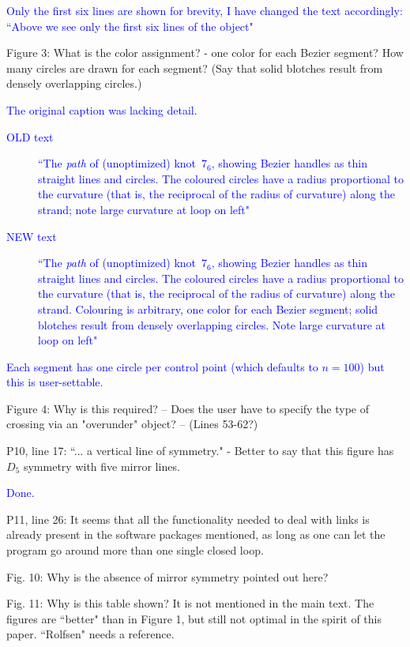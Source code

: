 \documentclass[12pt]{article}
\begin{document}
\textcolor{blue}{Only the first six lines are shown for brevity, I have
  changed the text accordingly: ``Above we see only the first six lines
of the object"}


Figure 3: What is the color assignment? - one color for each Bezier
segment?  How many circles are drawn for each segment?  (Say that
solid blotches result from densely overlapping circles.)

\textcolor{blue}{The original caption was lacking detail.
  \begin{description}
  \item[OLD text] ``The \emph{path} of (unoptimized) knot~$7_6$,
    showing Bezier handles as thin straight lines and circles.  The
    coloured circles have a radius proportional to the curvature (that
    is, the reciprocal of the radius of curvature) along the strand;
    note large curvature at loop on left"
  \item[NEW text] ``The \emph{path} of (unoptimized) knot~$7_6$,
    showing Bezier handles as thin straight lines and circles.  The
    coloured circles have a radius proportional to the curvature (that
    is, the reciprocal of the radius of curvature) along the strand.
    Colouring is arbitrary, one color for each Bezier segment; solid
    blotches result from densely overlapping circles.  Note large
    curvature at loop on left"
  \end{description}
  Each segment has one circle per control point (which defaults to
  $n=100$) but this is user-settable.
}



Figure 4: Why is this required?  -- Does the user have to specify the
type of crossing via an "overunder" object?  -- (Lines 53-62?)

P10, line 17: ``... a vertical line of symmetry." - Better to say that
this figure has $D_5$ symmetry with five mirror lines.


\textcolor{blue}{Done.}

P11, line 26: It seems that all the functionality needed to deal with
links is already present in the software packages mentioned, as long
as one can let the program go around more than one single closed loop.

Fig. 10: Why is the absence of mirror symmetry pointed out here?

Fig. 11: Why is this table shown?  It is not mentioned in the main
text.  The figures are ``better" than in Figure 1, but still not
optimal in the spirit of this paper.  ``Rolfsen" needs a reference.
\end{document}
